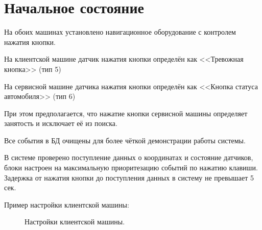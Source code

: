 \documentclass[russian,utf8,12pt,emptystyle]{eskdtext}
\begin{document}
\section{Начальное состояние}
\label{begin}
На обоих машинах установлено навигационное оборудование с контролем нажатия кнопки.

На клиентской машине датчик нажатия кнопки определён как <<Тревожная кнопка>> (тип 5)

На сервисной машине датчика нажатия кнопки определён как <<Кнопка статуса автомобиля>> (тип 6)

При этом предполагается, что нажатие кнопки сервисной машины определяет занятость и исключает её из поиска. 

Все события в БД очищены для более чёткой демонстрации работы системы.

В системе проверено поступление данных о координатах и состояние датчиков, блоки настроен на максимальную приоритезацию событий по нажатию клавиши. Задержка от нажатия кнопки до поступления данных в систему не превышает 5 сек.

Пример настройки клиентской машины:
  \begin{figure}[h]
  \begin{center}
  \end{center}
  \caption{Настройки клиентской машины.}
  \label{ris:imagemod01}
  \end{figure}
  
\end{document}
